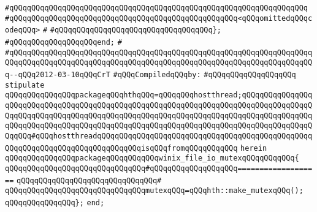 \verb|#qQQqqQQqqQQqqQQqqQQqqQQqqQQqqQQqqQQqqQQqqQQqqQQqqQQqqQQqqQQqqQQqqQQq|\newline
\verb|#qQQqqQQqqQQqqQQqqQQqqQQqqQQqqQQqqQQqqQQqqQQqqQQqqQQq<qQQqomittedqQQqcodeqQQq>|\newline
\verb|#|\newline
\verb|#qQQqqQQqqQQqqQQqqQQqqQQqqQQqqQQqqQQq};|\newline
\verb|#qQQqqQQqqQQqqQQqqQQqend;|\newline
\verb|#|\newline
\verb|#qQQqqQQqqQQqqQQqqQQqqQQqqQQqqQQqqQQqqQQqqQQqqQQqqQQqqQQqqQQqqQQqqQQqqQQqqQQqqQQqqQQqqQQqqQQqqQQqqQQqqQQqqQQqqQQqqQQqqQQqqQQqqQQqqQQqqQQqqQQq--qQQq2012-03-10qQQqCrT|\newline
\newline
\verb|#qQQqCompiledqQQqby:|\newline
\verb|#qQQqqQQqqQQqqQQqqQQq|\newline
\newline
\verb|stipulate|\newline
\verb|qQQqqQQqqQQqqQQqpackageqQQqhthqQQq=qQQqqQQqhostthread;qQQqqQQqqQQqqQQqqQQqqQQqqQQqqQQqqQQqqQQqqQQqqQQqqQQqqQQqqQQqqQQqqQQqqQQqqQQqqQQqqQQqqQQqqQQqqQQqqQQqqQQqqQQqqQQqqQQqqQQqqQQqqQQqqQQqqQQqqQQqqQQqqQQqqQQqqQQqqQQqqQQqqQQqqQQqqQQqqQQqqQQqqQQqqQQqqQQqqQQqqQQqqQQqqQQqqQQqqQQqqQQqqQQqqQQq#qQQqhostthreadqQQqqQQqqQQqqQQqqQQqqQQqqQQqqQQqqQQqqQQqqQQqqQQqqQQqqQQqqQQqqQQqqQQqqQQqqQQqqQQqisqQQqfromqQQqqQQqqQQq|\newline
\verb|herein|\newline
\verb|qQQqqQQqqQQqqQQqpackageqQQqqQQqqQQqwinix_file_io_mutexqQQqqQQqqQQq{|\newline
\verb|qQQqqQQqqQQqqQQqqQQqqQQqqQQqqQQq#qQQqqQQqqQQqqQQqqQQq===================|\newline
\verb|qQQqqQQqqQQqqQQqqQQqqQQqqQQqqQQq#|\newline
\verb|qQQqqQQqqQQqqQQqqQQqqQQqqQQqqQQqmutexqQQq=qQQqhth::make_mutexqQQq();|\newline
\verb|qQQqqQQqqQQqqQQq};|\newline
\verb|end;|\newline

